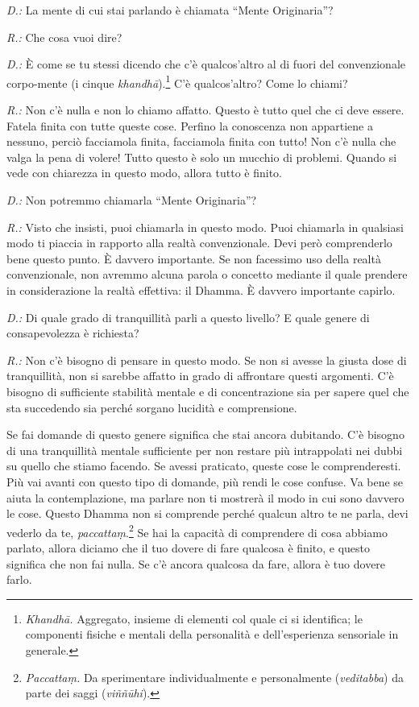 \emph{D.:} La mente di cui stai parlando è chiamata ``Mente Originaria''?

\emph{R.:} Che cosa vuoi dire?

\emph{D.:} È come se tu stessi dicendo che c'è qualcos'altro al di fuori del
convenzionale corpo-mente (i cinque \emph{khandhā}).\footnote{\emph{Khandhā.}
  Aggregato, insieme di elementi col quale ci si identifica; le
  componenti fisiche e mentali della personalità e dell'esperienza
  sensoriale in generale.} C'è qualcos'altro? Come lo chiami?

\emph{R.:} Non c'è nulla e non lo chiamo affatto. Questo è tutto quel che ci
deve essere. Fatela finita con tutte queste cose. Perfino la conoscenza
non appartiene a nessuno, perciò facciamola finita, facciamola finita
con tutto! Non c'è nulla che valga la pena di volere! Tutto questo è
solo un mucchio di problemi. Quando si vede con chiarezza in questo
modo, allora tutto è finito.

\emph{D.:} Non potremmo chiamarla ``Mente Originaria''?

\emph{R.:} Visto che insisti, puoi chiamarla in questo modo. Puoi chiamarla in
qualsiasi modo ti piaccia in rapporto alla realtà convenzionale. Devi
però comprenderlo bene questo punto. È davvero importante. Se non
facessimo uso della realtà convenzionale, non avremmo alcuna parola o
concetto mediante il quale prendere in considerazione la realtà
effettiva: il Dhamma. È davvero importante capirlo.

\emph{D.:} Di quale grado di tranquillità parli a questo livello? E quale
genere di consapevolezza è richiesta?

\emph{R.:} Non c'è bisogno di pensare in questo modo. Se non si avesse la
giusta dose di tranquillità, non si sarebbe affatto in grado di
affrontare questi argomenti. C'è bisogno di sufficiente stabilità
mentale e di concentrazione sia per sapere quel che sta succedendo sia
perché sorgano lucidità e comprensione.

Se fai domande di questo genere significa che stai ancora dubitando. C'è
bisogno di una tranquillità mentale sufficiente per non restare più
intrappolati nei dubbi su quello che stiamo facendo. Se avessi
praticato, queste cose le comprenderesti. Più vai avanti con questo tipo
di domande, più rendi le cose confuse. Va bene se aiuta la
contemplazione, ma parlare non ti mostrerà il modo in cui sono davvero
le cose. Questo Dhamma non si comprende perché qualcun altro te ne
parla, devi vederlo da te, \emph{paccattaṃ}.\footnote{\emph{Paccattaṃ.}
  Da sperimentare individualmente e personalmente (\emph{veditabba}) da
  parte dei saggi (\emph{viññūhi}).} Se hai la capacità di comprendere
di cosa abbiamo parlato, allora diciamo che il tuo dovere di fare
qualcosa è finito, e questo significa che non fai nulla. Se c'è ancora
qualcosa da fare, allora è tuo dovere farlo.

